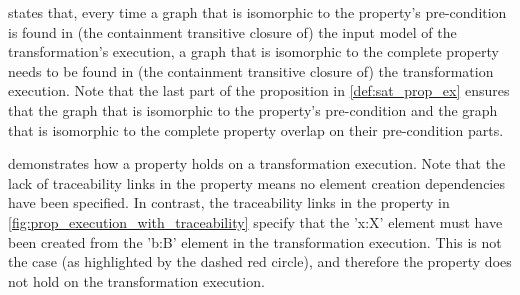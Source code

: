  states that, every time a graph that is isomorphic to the property's pre-condition is found in (the containment transitive closure of) the input model of the transformation's execution, a graph that is isomorphic to the complete property needs to be found in (the containment transitive closure of) the transformation execution. Note that the last part of the proposition in \cref{def:sat_prop_ex} ensures that the graph that is isomorphic to the property's pre-condition and the graph that is isomorphic to the complete property overlap on their pre-condition parts.


 demonstrates how a property holds on a transformation execution. Note that the lack of traceability links in the property means no element creation dependencies have been specified. In contrast, the traceability links in the property in \cref{fig:prop_execution_with_traceability} specify that the 'x:X' element must have been created from the 'b:B' element in the transformation execution. This is not the case (as highlighted by the dashed red circle), and therefore the property does not hold on the transformation execution.


